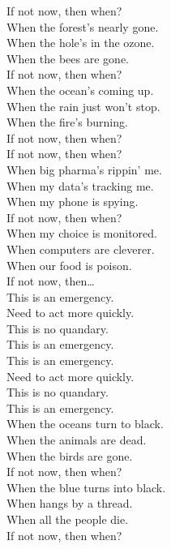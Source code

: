 
\label{album:lw}




If not now, then when? \\
When the forest's nearly gone. \\
When the hole's in the ozone. \\
When the bees are gone. \\
If not now, then when? \\
When the ocean's coming up. \\
When the rain just won't stop. \\
When the fire's burning. \\
If not now, then when? \\

If not now, then when? \\
When big pharma's rippin' me. \\
When my data's tracking me. \\
When my phone is spying. \\
If not now, then when? \\
When my choice is monitored. \\
When computers are cleverer. \\
When our food is poison. \\
If not now, then… \\

This is an emergency. \\
Need to act more quickly. \\
This is no quandary. \\
This is an emergency. \\

This is an emergency. \\
Need to act more quickly. \\
This is no quandary. \\
This is an emergency. \\

When the oceans turn to black. \\
When the animals are dead. \\
When the birds are gone. \\
If not now, then when? \\
When the blue  turns into black. \\
When  hangs by a thread. \\
When all the people die. \\
If not now, then when? \\

